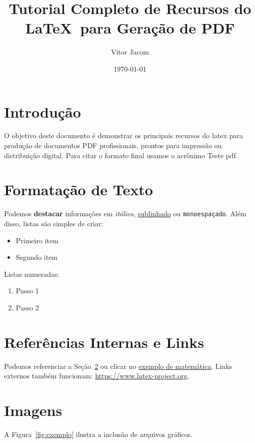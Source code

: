 \documentclass[12pt]{article}
\title{Tutorial Completo de Recursos do \\ \LaTeX\ para Geração de PDF}
\author{Vitor Jacom}
\date{\today}
\begin{document}
\maketitle
\tableofcontents
\newpage

\section{Introdução}
O objetivo deste documento é demonstrar os principais recursos do \gls{latex} para produção de documentos PDF profissionais, prontos para impressão ou distribuição digital. Para citar o formato final usamos o acrônimo Teste \gls{pdf}.

\section{Formatação de Texto}\label{sec:texto}
Podemos \textbf{destacar} informações em \textit{itálico}, \underline{sublinhado} ou
\texttt{monoespaçado}. Além disso, listas são simples de criar:

\begin{itemize}[noitemsep]
  \item Primeiro item
  \item Segundo item
\end{itemize}

Listas numeradas:

\begin{enumerate}[label=\arabic*.]
  \item Passo 1
  \item Passo 2
\end{enumerate}

\section{Referências Internas e Links}
Podemos referenciar a Seção~\ref{sec:texto} ou clicar no
\hyperref[sec:matematica]{exemplo de matemática}. Links externos também funcionam: \url{https://www.latex-project.org}.

\section{Imagens}
A Figura~\ref{fig:exemplo} ilustra a inclusão de arquivos gráficos.
\end{document}
